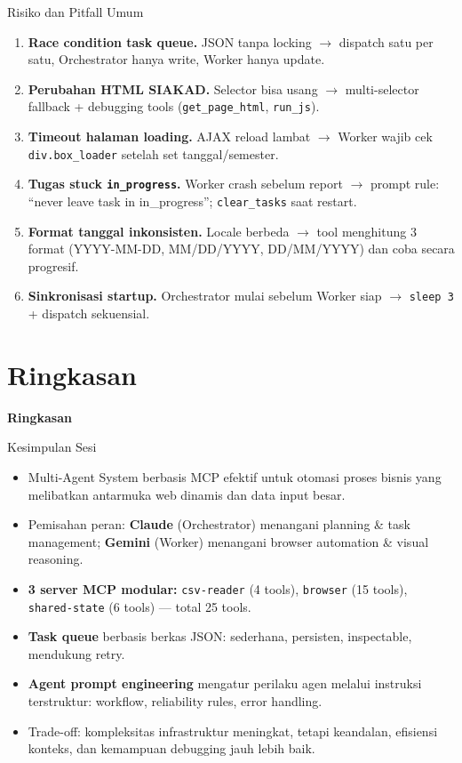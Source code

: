 \documentclass[aspectratio=169, table]{beamer}
\begin{document}
\begin{frame}{Risiko dan Pitfall Umum}
\vspace{6pt}
\footnotesize
\begin{enumerate}
  \item \textbf{Race condition task queue.} JSON tanpa locking $\rightarrow$ dispatch satu per satu, Orchestrator hanya write, Worker hanya update.
  \item \textbf{Perubahan HTML SIAKAD.} Selector bisa usang $\rightarrow$ multi-selector fallback + debugging tools (\texttt{get\_page\_html}, \texttt{run\_js}).
  \item \textbf{Timeout halaman loading.} AJAX reload lambat $\rightarrow$ Worker wajib cek \texttt{div.box\_loader} setelah set tanggal/semester.
  \item \textbf{Tugas stuck \texttt{in\_progress}.} Worker crash sebelum report $\rightarrow$ prompt rule: ``never leave task in in\_progress''; \texttt{clear\_tasks} saat restart.
  \item \textbf{Format tanggal inkonsisten.} Locale berbeda $\rightarrow$ tool menghitung 3 format (YYYY-MM-DD, MM/DD/YYYY, DD/MM/YYYY) dan coba secara progresif.
  \item \textbf{Sinkronisasi startup.} Orchestrator mulai sebelum Worker siap $\rightarrow$ \texttt{sleep 3} + dispatch sekuensial.
\end{enumerate}
\end{frame}

\section{Ringkasan}
\begin{frame}{\hfill}
	\centering
	\Huge{\textbf{Ringkasan}}
\end{frame}

\begin{frame}{Kesimpulan Sesi}
\vspace{15pt}
\begin{itemize}\small
  \item Multi-Agent System berbasis MCP efektif untuk otomasi proses bisnis yang melibatkan antarmuka web dinamis dan data input besar.
  \item Pemisahan peran: \textbf{Claude} (Orchestrator) menangani planning \& task management; \textbf{Gemini} (Worker) menangani browser automation \& visual reasoning.
  \item \textbf{3 server MCP modular:} \texttt{csv-reader} (4 tools), \texttt{browser} (15 tools), \texttt{shared-state} (6 tools) --- total 25 tools.
  \item \textbf{Task queue} berbasis berkas JSON: sederhana, persisten, inspectable, mendukung retry.
  \item \textbf{Agent prompt engineering} mengatur perilaku agen melalui instruksi terstruktur: workflow, reliability rules, error handling.
  \item Trade-off: kompleksitas infrastruktur meningkat, tetapi keandalan, efisiensi konteks, dan kemampuan debugging jauh lebih baik.
\end{itemize}
\end{frame}
\end{document}
